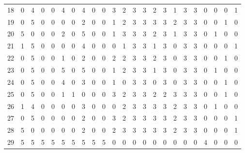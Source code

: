 \begin{table}[htbp]
{\begin{tabular}{lllllllllllllllllllllll}
18                  & 0 & 4 & 0 & 0 & 4 & 0 & 4 & 0 & 0 & 3 & 2 & 3 & 3 & 2 & 3 & 1 & 3 & 3 & 0                  & 0                   & 0                   & 1                   \\
19                  & 0 & 5 & 0 & 0 & 0 & 0 & 2 & 0 & 0 & 1 & 2 & 3 & 3 & 3 & 3 & 2 & 3 & 3 & 0                  & 0                   & 1                   & 0                   \\
20                  & 5 & 0 & 0 & 0 & 2 & 0 & 5 & 0 & 0 & 1 & 3 & 3 & 3 & 2 & 3 & 1 & 3 & 3 & 0                  & 1                   & 0                   & 0                   \\
21                  & 1 & 5 & 0 & 0 & 0 & 0 & 4 & 0 & 0 & 0 & 1 & 3 & 3 & 1 & 3 & 0 & 3 & 3 & 0                  & 0                   & 0                   & 1                   \\
22                  & 0 & 5 & 0 & 0 & 1 & 0 & 2 & 0 & 0 & 2 & 2 & 3 & 3 & 2 & 3 & 0 & 3 & 3 & 0                  & 0                   & 1                   & 0                   \\
23                  & 0 & 5 & 0 & 0 & 5 & 0 & 5 & 0 & 0 & 1 & 2 & 3 & 3 & 1 & 3 & 0 & 3 & 3 & 0                  & 1                   & 0                   & 0                   \\
24                  & 0 & 5 & 0 & 0 & 4 & 0 & 3 & 0 & 0 & 1 & 0 & 3 & 3 & 0 & 3 & 0 & 3 & 3 & 0                  & 0                   & 1                   & 0                   \\
25                  & 0 & 5 & 0 & 0 & 1 & 1 & 0 & 0 & 0 & 3 & 2 & 3 & 3 & 2 & 2 & 3 & 3 & 3 & 0                  & 0                   & 1                   & 0                   \\
26                  & 1 & 4 & 0 & 0 & 0 & 0 & 3 & 0 & 0 & 0 & 2 & 3 & 3 & 3 & 3 & 2 & 3 & 3 & 0                  & 1                   & 0                   & 0                   \\
27                  & 0 & 5 & 0 & 0 & 0 & 0 & 2 & 0 & 0 & 3 & 2 & 3 & 3 & 3 & 3 & 2 & 3 & 3 & 0                  & 0                   & 0                   & 1                   \\
28                  & 5 & 0 & 0 & 0 & 0 & 0 & 2 & 0 & 0 & 2 & 3 & 3 & 3 & 3 & 3 & 2 & 3 & 3 & 0                  & 0                   & 0                   & 1                   \\
29                  & 5 & 5 & 5 & 5 & 5 & 5 & 5 & 5 & 5 & 0 & 0 & 0 & 0 & 0 & 0 & 0 & 0 & 0 & 4                  & 0                   & 0                   & 0                   \\

\end{tabular}}
\end{table}
